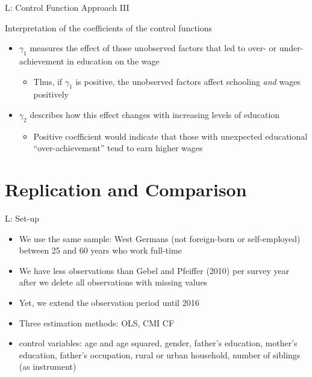 \documentclass[10pt,ignorenonframetext,]{beamer}
\providecommand{\tightlist}{%
  \setlength{\itemsep}{0pt}\setlength{\parskip}{0pt}}
\begin{document}
\begin{frame}{L: Control Function Approach III}
\protect\hypertarget{l-control-function-approach-iii}{}

Interpretation of the coefficients of the control functions

\begin{itemize}
\tightlist
\item
  \(\gamma_1\) measures the effect of those unobserved factors that led
  to over- or under-achievement in education on the wage

  \begin{itemize}
  \tightlist
  \item
    Thus, if \(\gamma_1\) is positive, the unobserved factors affect
    schooling \emph{and} wages positively
  \end{itemize}
\item
  \(\gamma_2\) describes how this effect changes with increasing levels
  of education

  \begin{itemize}
  \tightlist
  \item
    Positive coefficient would indicate that those with unexpected
    educational ``over-achievement'' tend to earn higher wages
  \end{itemize}
\end{itemize}

\end{frame}

\hypertarget{replication-and-comparison}{%
\section{Replication and Comparison}\label{replication-and-comparison}}

\begin{frame}{L: Set-up}
\protect\hypertarget{l-set-up}{}

\begin{itemize}
\tightlist
\item
  We use the same sample: West Germans (not foreign-born or
  self-employed) between 25 and 60 years who work full-time
\item
  We have less observations than Gebel and Pfeiffer (2010) per survey
  year after we delete all observations with missing values
\item
  Yet, we extend the observation period until 2016
\item
  Three estimation methods: OLS, CMI CF
\item
  control variables: age and age squared, gender, father's education,
  mother's education, father's occupation, rural or urban household,
  number of siblings (as instrument)
\end{itemize}

\end{frame}
\end{document}
